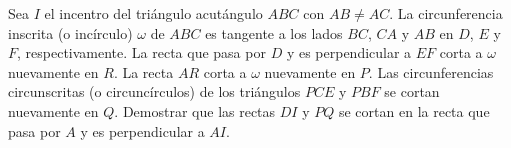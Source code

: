 Sea $I$ el incentro del triángulo acutángulo $ABC$ con $AB\neq AC$. La circunferencia inscrita (o incírculo) $\omega$ de $ABC$ es tangente a los lados $BC$, $CA$ y $AB$ en $D$, $E$ y $F$, respectivamente. La recta que pasa por $D$ y es perpendicular a $EF$ corta a $\omega$ nuevamente en $R$. La recta $AR$ corta a $\omega$ nuevamente en $P$. Las circunferencias circunscritas (o circuncírculos) de los triángulos $PCE$ y $PBF$ se cortan nuevamente en $Q$.
Demostrar que las rectas $DI$ y $PQ$ se cortan en la recta que pasa por $A$ y es perpendicular a $AI.$
